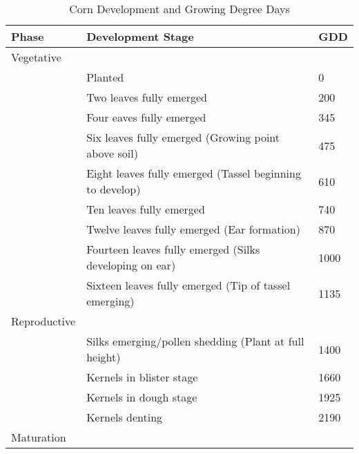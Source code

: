 \begin{table}[!htbp]
\caption{Corn Development and Growing Degree Days \citep{neild1987growing}}
\label{GDD_tab}
\begin{tabular}{lll}
\hline
Phase        & Development Stage                                                                                & GDD  \\
\hline
Vegetative   &                                                                                                  &      \\

             & Planted                                                                                          & 0    \\
             & Two leaves fully emerged                                                                         & 200  \\
             & Four eaves fully emerged                                                                         & 345  \\
             & Six leaves fully emerged (Growing point above soil) & 475  \\
             & Eight leaves fully emerged (Tassel beginning to develop)                                         & 610  \\
             & Ten leaves fully emerged                                                                         & 740  \\
             & Twelve leaves fully emerged (Ear formation)                                                      & 870  \\
             & Fourteen leaves fully emerged (Silks developing on ear)                                          & 1000 \\
             & Sixteen leaves fully emerged (Tip of tassel emerging)                                            & 1135 \\

Reproductive &                                                                                                  &      \\

             & Silks emerging/pollen shedding (Plant at full height)                                            & 1400 \\
             & Kernels in blister stage        & 1660 \\
             & Kernels in dough stage                                                                           & 1925 \\
             & Kernels denting                                                                                  & 2190 \\
Maturation   &                                                                                                  &      \\


\end{tabular}
\end{table}
